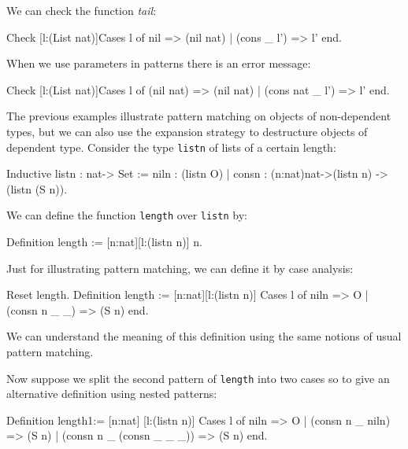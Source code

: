 We can check the function {\em tail}:

\begin{coq_example}
Check [l:(List nat)]Cases l of 
                             nil        => (nil nat)
                          | (cons _ l') => l'
                           end.
\end{coq_example}


When we use parameters in patterns there is an error message:
\begin{coq_example}
Check [l:(List nat)]Cases l of 
                             (nil nat)      => (nil nat)
                          | (cons nat _ l') => l'
                           end.
\end{coq_example}



The previous examples illustrate pattern matching on objects of
non-dependent types, but we can also 
use the expansion strategy to destructure objects of dependent type.
Consider the type \texttt{listn} of lists of a certain length:

\begin{coq_example}
Inductive listn : nat-> Set := 
  niln : (listn O) 
| consn : (n:nat)nat->(listn n) -> (listn (S n)).
\end{coq_example}

We can define the function \texttt{length} over \texttt{listn} by:

\begin{coq_example}
Definition length := [n:nat][l:(listn n)] n.
\end{coq_example}

Just for illustrating pattern matching, 
we can define it by case analysis:
\begin{coq_example}
Reset length.
Definition length := [n:nat][l:(listn n)]
                      Cases l of  
                         niln         => O 
                      | (consn n _ _) => (S n) 
                      end.
\end{coq_example}

We can understand the meaning of this definition using the
same notions of usual pattern matching.

Now suppose we split the second pattern  of \texttt{length} into two 
cases so to give an
alternative definition using nested patterns:
\begin{coq_example}
Definition length1:= [n:nat] [l:(listn n)]
   Cases l of 
        niln                   => O
   | (consn n _ niln)          => (S n)
   | (consn n _ (consn _ _ _)) => (S n)
  end.
\end{coq_example}

